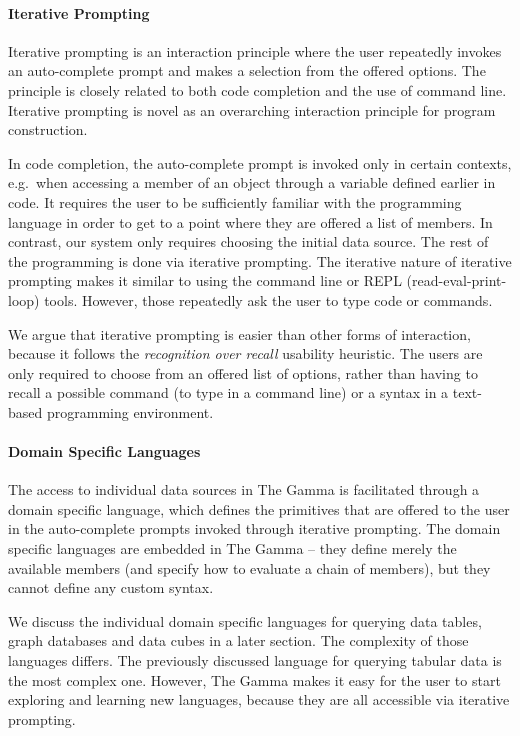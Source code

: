 \documentclass[manuscript,review,anonymous]{acmart}
\begin{document}
\paragraph{Iterative Prompting}
Iterative prompting is an interaction principle where the user repeatedly invokes an
auto-complete prompt and makes a selection from the offered options. The principle is closely
related to both code completion and the use of command line. Iterative prompting is novel as an
overarching interaction principle for program construction.

In code completion, the auto-complete
prompt is invoked only in certain contexts, e.g.~when accessing a member of an object through a
variable defined earlier in code. It requires the user to be sufficiently familiar with the
programming language in order to get to a point where they are offered a list of members. In
contrast, our system only requires choosing the initial data source. The rest of the programming
is done via iterative prompting. The iterative nature of iterative prompting makes it similar to
using the command line or REPL (read-eval-print-loop) tools. However, those repeatedly ask the
user to type code or commands.

We argue that iterative prompting is easier than other forms of interaction, because it
follows the \emph{recognition over recall} usability heuristic. The users are only required to
choose from an offered list of options, rather than having to recall a possible command
(to type in a command line) or a syntax in a text-based programming environment.

\paragraph{Domain Specific Languages}
The access to individual data sources in The Gamma is facilitated through a domain specific
language, which defines the primitives that are offered to the user in the auto-complete prompts
invoked through iterative prompting. The domain specific languages are embedded in The Gamma --
they define merely the available members (and specify how to evaluate a chain of members), but
they cannot define any custom syntax.

We discuss the individual domain specific languages for querying data tables, graph databases and
data cubes in a later section. The complexity of those languages differs. The previously discussed
language for querying tabular data is the most complex one. However, The Gamma makes it easy for
the user to start exploring and learning new languages, because they are all accessible via
iterative prompting.
\end{document}
